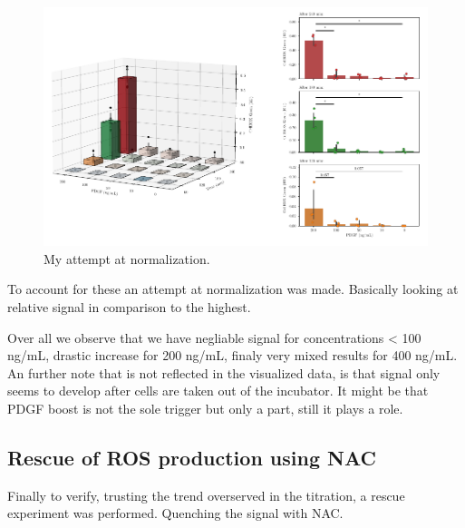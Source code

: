     \begin{figure}[h]
    \capstart
        \centering
    	\includegraphics{Abbildung/CellROX_titration_norm.pdf}

    	\begin{minipage}{\captionwidth}
    		\caption[cellROX_titration_norm]{ \newline My attempt at normalization.}
    		\label{fig:qPCR}
    	\end{minipage}
    \end{figure}

    To account for these an attempt at normalization was made. Basically looking at relative signal in comparison to the highest.

    Over all we observe that we have negliable signal for concentrations < 100 ng/mL, drastic increase for 200 ng/mL, finaly very mixed results for 400 ng/mL. An further note that is not reflected in the visualized data, is that signal only seems to develop after cells are taken out of the incubator. It might be that PDGF boost is not the sole trigger but only a part, still it plays a role.

    \subsection{Rescue of ROS production using NAC}
    Finally to verify, trusting the trend overserved in the titration, a rescue experiment was performed. Quenching the signal with NAC.

